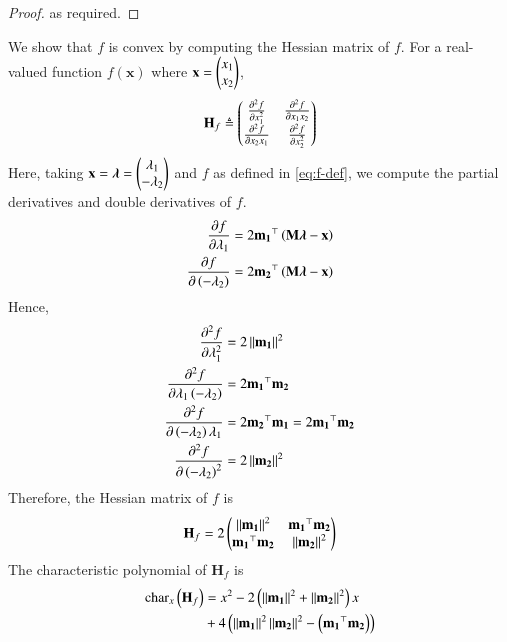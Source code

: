 \documentclass[journal,12pt,twocolumn]{IEEEtran}
\renewcommand{\vec}[1]{\boldsymbol{\mathbf{#1}}}
\begin{document}
\begin{enumerate}
\begin{proof}
        as required.
    \end{proof}
    We show that $f$ is convex by computing the Hessian matrix of $f$. For
    a real-valued function $f(\vec{x})$ where $\vec{x} = \myvec{x_1\\x_2}$,
    \begin{align}
        \vec{H}_f \triangleq \myvec{\frac{\partial^2f}{\partial x_1^2}&\frac{\partial^2f}{\partial x_1x_2}\\\frac{\partial^2f}{\partial x_2x_1}&\frac{\partial^2f}{\partial x_2^2}}
        \label{eq:H-def}
    \end{align}
    Here, taking $\vec{x} = \vec{\lambda} = \myvec{\lambda_1\\-\lambda_2}$ and
    $f$ as defined in \eqref{eq:f-def}, we compute the partial derivatives and
    double derivatives of $f$.
    \begin{align}
        \frac{\partial f}{\partial\lambda_1} &= 2\vec{m_1}^\top\brak{\vec{M\lambda}-\vec{x}} \label{eq:dx} \\
        \frac{\partial f}{\partial\brak{-\lambda_2}} &= 2\vec{m_2}^\top\brak{\vec{M\lambda}-\vec{x}} \label{eq:dy}
    \end{align}
    Hence,
    \begin{align}
        \frac{\partial^2f}{\partial\lambda_1^2} &= 2\norm{\vec{m_1}}^2 \label{eq:d2x} \\
        \frac{\partial^2f}{\partial\lambda_1\brak{-\lambda_2}} &= 2\vec{m_1}^\top\vec{m_2} \label{eq:dxdy} \\ 
        \frac{\partial^2f}{\partial\brak{-\lambda_2}\lambda_1} &= 2\vec{m_2}^\top\vec{m_1} = 2\vec{m_1}^\top\vec{m_2} \label{eq:dydx} \\
        \frac{\partial^2f}{\partial\brak{-\lambda_2}^2} &= 2\norm{\vec{m_2}}^2 \label{eq:d2y}
    \end{align}
    Therefore, the Hessian matrix of $f$ is
    \begin{align}
        \vec{H}_f = 2\myvec{\norm{\vec{m_1}}^2&\vec{m_1}^\top\vec{m_2}\\\vec{m_1}^\top\vec{m_2}&\norm{\vec{m_2}}^2}
        \label{eq:H-f}
    \end{align}
    The characteristic polynomial of $\vec{H}_f$ is
    \begin{align}
        \textrm{char}_x\brak{\vec{H}_f} &= x^2 - 2\brak{\norm{\vec{m_1}}^2+\norm{\vec{m_2}}^2}x \nonumber \\
                                        &+ 4\brak{\norm{\vec{m_1}}^2\norm{\vec{m_2}}^2 - \brak{\vec{m_1}^\top\vec{m_2}}}

\end{align}
\end{enumerate}
\end{document}
